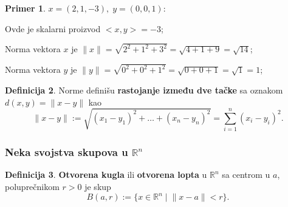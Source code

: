 \documentclass[11pt]{article}
\theoremstyle{definition}
\newtheorem{definicija}{Definicija}[section]
\newtheorem{primer}[definicija]{Primer}
\theoremstyle{serbnodot}
\begin{document}
\begin{primer}
    \( x = (2, 1, -3), \; y = (0, 0, 1) \):
    \begin{center}
    \end{center}

    Ovde je skalarni proizvod \( <x, y> = -3 \);
    
    Norma vektora \( x \) je  \( \lVert x \rVert= \sqrt{2^2 + 1^2 + 3^2} 
    = \sqrt{4 + 1 + 9} = \sqrt{14} \);

    Norma vektora \( y \) je \( \lVert y \rVert= \sqrt{0^2 + 0^2 + 1^2} 
    = \sqrt{0 + 0 + 1} = \sqrt{1} = 1 \);

\end{primer}


\begin{definicija}
     Norme definišu \textbf{rastojanje između dve tačke} sa oznakom \(d(x, y) = 
     \lVert x-y \rVert \) kao
     \[
        \lVert x - y \rVert := \sqrt{(x_1 - y_1)^2 + \dots + (x_n - y_n)^2} 
        = \sum_{i=1}^{n}{(x_i - y_i)^2}.
     \] 
\end{definicija}

\subsubsection{Neka svojstva skupova u \( \mathbb{R}^n \)}

\begin{definicija}
    \textbf{Otvorena kugla} ili \textbf{otvorena lopta} u \(\mathbb{R}^n\) sa centrom u \(a\), poluprečnikom
    \(r > 0\) je skup
    \[
        B(a,r) := \{ x \in \mathbb{R}^n \mid \lVert x - a \rVert < r \}.
    \]
\end{definicija}
\end{document}
